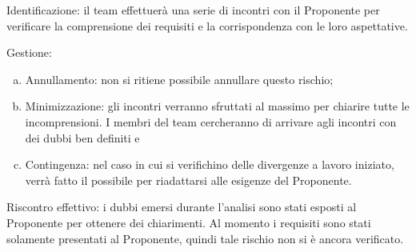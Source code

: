 \documentclass[../analisi_dei_rischi.tex]{subfiles}
\begin{document}
	Identificazione: il team effettuerà una serie di incontri con il Proponente per verificare la comprensione dei requisiti e la corrispondenza con le loro aspettative.
	
	Gestione:
	\begin{enumerate}[(a)]
		\item Annullamento: non si ritiene possibile annullare questo rischio;
		\item Minimizzazione: gli incontri verranno sfruttati al massimo per chiarire tutte le incomprensioni. I membri del team cercheranno di arrivare agli incontri con dei dubbi ben definiti e 
		\item Contingenza: nel caso in cui si verifichino delle divergenze a lavoro iniziato, verrà fatto il possibile per riadattarsi alle esigenze del Proponente.
	\end{enumerate}	
	Riscontro effettivo: i dubbi emersi durante l’analisi sono stati esposti al Proponente per ottenere dei chiarimenti. Al momento i requisiti sono stati solamente presentati al Proponente, quindi tale rischio non si è ancora verificato.

			
\end{document}
